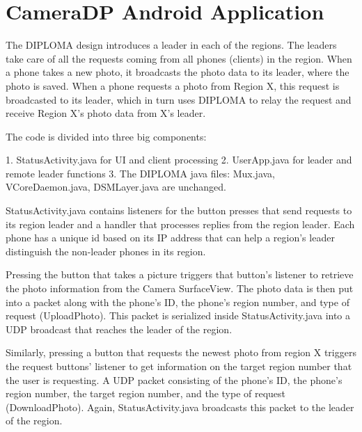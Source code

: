 \chapter{CameraDP Android Application}


The DIPLOMA design introduces a leader in each of the regions.  The leaders take care of all the requests coming from all phones (clients) in the region.  When a phone takes a new photo, it broadcasts the photo data to its leader, where the photo is saved. When a phone requests a photo from Region X, this request is broadcasted to its leader, which in turn uses DIPLOMA to relay the request and receive Region X’s photo data from X’s leader.

The code is divided into three big components: 

1.  StatusActivity.java for UI and client processing
2.  UserApp.java for leader and remote leader functions
3.  The DIPLOMA java files: Mux.java, VCoreDaemon.java, DSMLayer.java are unchanged.

StatusActivity.java contains listeners for the button presses that send requests to its region leader and a handler that processes replies from the region leader. Each phone has a unique id based on its IP address that can help a region’s leader distinguish the non-leader phones in its region.  

Pressing the button that takes a picture triggers that button’s listener to retrieve the photo information from the Camera SurfaceView. The photo data is then put into a packet along with the phone’s ID, the phone’s region number, and type of request (UploadPhoto). This packet is serialized inside StatusActivity.java into a UDP broadcast that reaches the leader of the region.

Similarly, pressing a button that requests the newest photo from region X triggers the request buttons’ listener to get information on the target region number that the user is requesting. A UDP packet consisting of the phone’s ID, the phone’s region number, the target region number, and the type of request (DownloadPhoto). Again, StatusActivity.java broadcasts this packet to the leader of the region.


